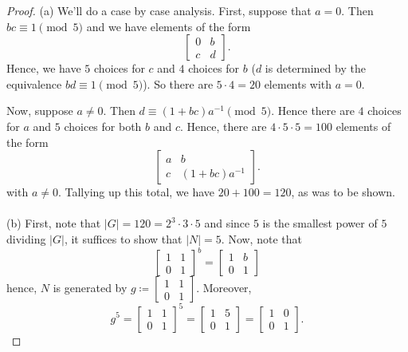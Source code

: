 \begin{proof}
(a) We'll do a case by case analysis. First, suppose that $a=0$. Then
$bc\equiv 1\pmod{5}$ and we have elements of the form
\[
\begin{bmatrix}
0&b\\
c&d
\end{bmatrix}.
\]
Hence, we have $5$ choices for $c$ and $4$ choices for $b$ ($d$ is
determined by the equivalence $bd\equiv 1\pmod{5}$). So there are $5\cdot
4=20$ elements with $a=0$.

Now, suppose $a\neq 0$. Then $d\equiv(1+bc)a^{-1}\pmod{5}$. Hence there are
$4$ choices for $a$ and $5$ choices for both $b$ and $c$. Hence, there are
$4\cdot 5\cdot 5=100$ elements of the form
\[
\begin{bmatrix}
a&b\\
c&(1+bc)a^{-1}
\end{bmatrix}.
\]
with $a\neq 0$. Tallying up this total, we have $20+100=120$, as was to be
shown.
\\\\
(b) First, note that $|G|=120=2^3\cdot 3\cdot 5$ and since $5$ is the smallest
power of $5$ dividing $|G|$, it suffices to show that $|N|=5$. Now, note
that
\[
\begin{bmatrix}
1&1\\
0&1
\end{bmatrix}^b
=
\begin{bmatrix}
1&b\\
0&1
\end{bmatrix}
\]
hence, $N$ is generated by
$g\coloneqq\left[\begin{smallmatrix}1&1\\0&1\end{smallmatrix}\right]$. Moreover,
\[
g^5=
\begin{bmatrix}
1&1\\
0&1
\end{bmatrix}^5
=
\begin{bmatrix}
1&5\\
0&1
\end{bmatrix}
=
\begin{bmatrix}
1&0\\
0&1
\end{bmatrix}.
\]
\end{proof}
